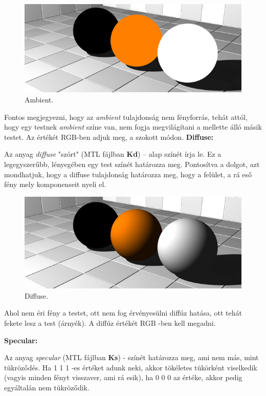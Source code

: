 \begin{figure}[h]
\centering
\includegraphics[scale=0.5]{images/ambient.jpg}
\caption{Ambient.}
\end{figure}
Fontos megjegyezni, hogy az \textsl{ambient} tulajdonság nem fényforrás, tehát attól, hogy egy testnek \textsl{ambient} színe van, nem fogja megvilágítani a mellette álló másik testet. Az értékét RGB-ben adjuk meg, a szokott módon.
\newpage
\noindent \textbf{Diffuse:}

Az anyag \textsl{diffuse} "szórt" (MTL fájlban \textbf{Kd}) – alap színét írja le. Ez a legegyszerűbb, lényegében egy test színét határozza meg. Pontosítva a dolgot, azt mondhatjuk, hogy a diffuse tulajdonság határozza meg, hogy a felület, a rá eső fény mely komponenseit nyeli el.

\begin{figure}[h]
\centering
\includegraphics[scale=0.5]{images/diffuse.jpg}
\caption{Diffuse.}
\end{figure}
Ahol nem éri fény a testet, ott nem fog érvényesülni diffúz hatása, ott tehát fekete lesz a test (árnyék). A diffúz értékét RGB -ben kell megadni.\newline

\noindent \textbf{Specular:}

Az anyag \textsl{specular} (MTL fájlban \textbf{Ks})  - színét határozza meg, ami nem más, mint tükröződés. Ha 1 1 1 -es értéket adunk neki, akkor tökéletes tükörként viselkedik (vagyis minden fényt visszaver, ami rá esik), ha 0 0 0 az értéke, akkor pedig egyáltalán nem tükröződik.

